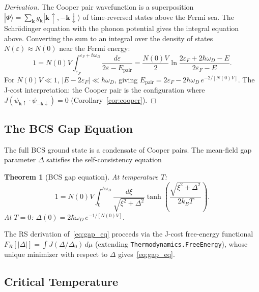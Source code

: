 \documentclass[12pt,a4paper]{article}
\newtheorem{theorem}{Theorem}[section]
\theoremstyle{definition}
\theoremstyle{remark}
\begin{document}
\begin{proof}[Derivation]
The Cooper pair wavefunction is a superposition $|\Phi\rangle =
\sum_\mathbf{k} g_\mathbf{k} |\mathbf{k}\uparrow, -\mathbf{k}
\downarrow\rangle$ of time-reversed states above the Fermi sea.
The Schr\"{o}dinger equation with the phonon potential gives the
integral equation above.  Converting the sum to an integral over the
density of states $N(\varepsilon) \approx N(0)$ near the Fermi energy:
\begin{equation}
  1 = N(0)V \int_{\varepsilon_F}^{\varepsilon_F + \hbar\omega_D}
  \frac{d\varepsilon}{2\varepsilon - E_\mathrm{pair}}
  = \frac{N(0)V}{2} \ln\frac{2\varepsilon_F + 2\hbar\omega_D - E}{2\varepsilon_F - E}.
\end{equation}
For $N(0)V \ll 1$, $|E - 2\varepsilon_F| \ll \hbar\omega_D$, giving
$E_\mathrm{pair} = 2\varepsilon_F - 2\hbar\omega_D\,e^{-2/[N(0)V]}$.
The J-cost interpretation: the Cooper pair is the configuration where
$J(\psi_{\mathbf{k}\uparrow} \cdot \psi_{-\mathbf{k}\downarrow}) = 0$
(Corollary~\ref{cor:cooper}).
\end{proof}

\subsection{The BCS Gap Equation}

The full BCS ground state is a condensate of Cooper pairs.  The
mean-field gap parameter $\Delta$ satisfies the self-consistency
equation

\begin{theorem}[BCS gap equation]\label{thm:gap}
At temperature $T$:
\begin{equation}
  1 = N(0)V \int_0^{\hbar\omega_D}
  \frac{d\xi}{\sqrt{\xi^2 + \Delta^2}}
  \tanh\!\left(\frac{\sqrt{\xi^2 + \Delta^2}}{2k_B T}\right).
  \label{eq:gap_eq}
\end{equation}
At $T = 0$: $\Delta(0) = 2\hbar\omega_D\,e^{-1/[N(0)V]}$.
\end{theorem}

The RS derivation of~\eqref{eq:gap_eq} proceeds via the J-cost
free-energy functional $F_R[|\Delta|] = \int J(\Delta/\Delta_0)\,
d\mu$ (extending \texttt{Thermodynamics.FreeEnergy}), whose unique
minimizer with respect to $\Delta$ gives~\eqref{eq:gap_eq}.

\subsection{Critical Temperature}
\end{document}
